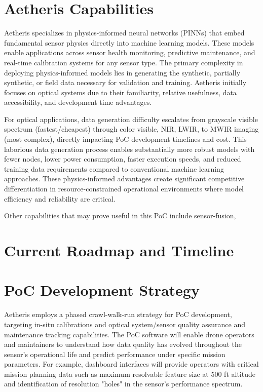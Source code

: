 \documentclass[11pt,letterpaper]{article}
\begin{document}
\section*{Aetheris Capabilities}
Aetheris specializes in physics-informed neural networks (PINNs) that embed fundamental sensor physics directly into machine learning models. These models enable applications across sensor health monitoring, predictive maintenance, and real-time calibration systems for any sensor type. The primary complexity in deploying physics-informed models lies in generating the synthetic, partially synthetic, or field data necessary for validation and training. Aetheris initially focuses on optical systems due to their familiarity, relative usefulness, data accessibility, and development time advantages. 


For optical applications, data generation difficulty escalates from grayscale visible spectrum (fastest/cheapest) through color visible, NIR, LWIR, to MWIR imaging (most complex), directly impacting PoC development timelines and cost. This laborious data generation process enables substantially more robust models with fewer nodes, lower power consumption, faster execution speeds, and reduced training data requirements compared to conventional machine learning approaches. These physics-informed advantages create significant competitive differentiation in resource-constrained operational environments where model efficiency and reliability are critical.

Other capabilities that may prove useful in this PoC include sensor-fusion, 

\section*{Current Roadmap and Timeline}

\section*{PoC Development Strategy}
Aetheris employs a phased crawl-walk-run strategy for PoC development, targeting in-situ calibrations and optical system/sensor quality assurance and maintenance tracking capabilities. The PoC software will enable drone operators and maintainers to understand how data quality has evolved throughout the sensor's operational life and predict performance under specific mission parameters. For example, dashboard interfaces will provide operators with critical mission planning data such as maximum resolvable feature size at 500 ft altitude and identification of resolution "holes" in the sensor's performance spectrum.
\end{document}
